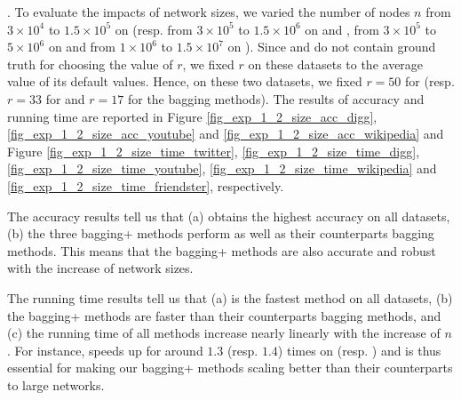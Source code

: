 . To evaluate the impacts of network sizes, we varied the
number of nodes $n$ from $3\times 10^4$ to $1.5\times 10^5$ on \Digg (resp.
from $3\times 10^5$ to $1.5\times 10^6$ on \YouTube and \Wikipedia,
from $3\times 10^5$ to $5\times 10^6$ on \Twitter and
from $1\times 10^6$ to $1.5\times 10^7$ on \Friendster).
Since \Twitter and \Friendster do not contain ground truth for choosing the value of $r$,
we fixed $r$ on these datasets to the average value of
its default values. Hence, on these two datasets, we fixed $r = 50$ for \NMF
(resp. $r = 33$ for \BIGCLAM and $r = 17$ for the bagging methods). The results
of accuracy and running time are reported in Figure \ref{fig_exp_1_2_size_acc_digg},
\ref{fig_exp_1_2_size_acc_youtube} and \ref{fig_exp_1_2_size_acc_wikipedia}
and Figure \ref{fig_exp_1_2_size_time_twitter}, \ref{fig_exp_1_2_size_time_digg}, 
\ref{fig_exp_1_2_size_time_youtube}, \ref{fig_exp_1_2_size_time_wikipedia} and
\ref{fig_exp_1_2_size_time_friendster}, respectively.



The accuracy results tell us that (a) \Biased obtains the highest accuracy on all
datasets, (b) the three bagging+ methods perform as well as their counterparts
bagging methods. This means that the bagging+ methods are also accurate and
robust with the increase of network sizes.

The running time results tell us that (a) \Biasedp is the fastest method on all
datasets, (b) the bagging+ methods are faster than their counterparts bagging
methods, and (c) the running time of all methods increase nearly linearly with the
increase of $n$. For instance, \Biasedp speeds up \Biased for around
$1.3$ (resp. $1.4$) times on \Twitter (resp. \Friendster) and is thus essential for
making our bagging+ methods scaling better than their counterparts to large networks.



